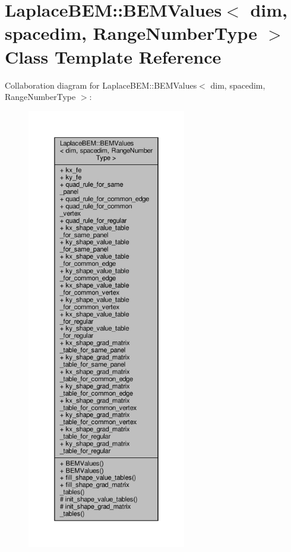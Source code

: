 \hypertarget{classLaplaceBEM_1_1BEMValues}{}\section{Laplace\+B\+EM\+:\+:B\+E\+M\+Values$<$ dim, spacedim, Range\+Number\+Type $>$ Class Template Reference}
\label{classLaplaceBEM_1_1BEMValues}


Collaboration diagram for Laplace\+B\+EM\+:\+:B\+E\+M\+Values$<$ dim, spacedim, Range\+Number\+Type $>$\+:\nopagebreak
\begin{figure}[H]
\begin{center}
\leavevmode
\includegraphics[height=550pt]{classLaplaceBEM_1_1BEMValues__coll__graph}
\end{center}
\end{figure}
